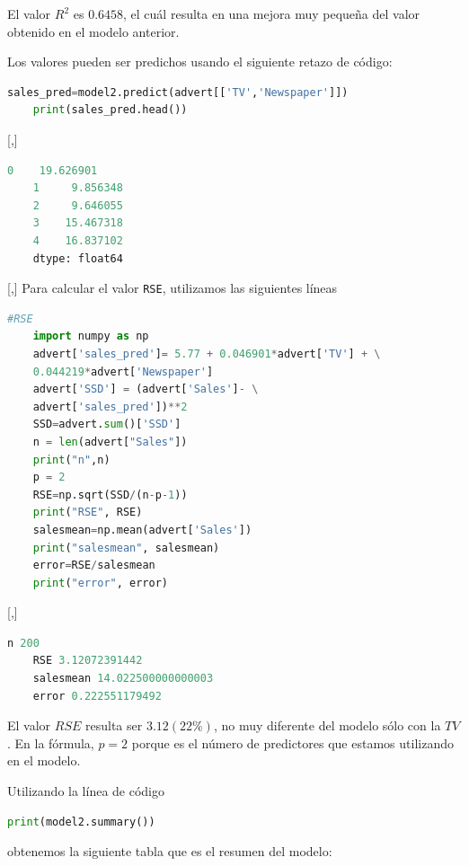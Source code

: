 El valor $R^{2}$ es $0.6458$, el cuál resulta en una mejora muy pequeña del valor obtenido en el modelo anterior.

Los valores pueden ser predichos usando el siguiente retazo de código:
\begin{lstlisting}[language=Python]
	sales_pred=model2.predict(advert[['TV','Newspaper']])
	print(sales_pred.head())
\end{lstlisting}

[,]{}
\begin{lstlisting}[language=Python]
	0    19.626901
	1     9.856348
	2     9.646055
	3    15.467318
	4    16.837102
	dtype: float64
\end{lstlisting}

[,]{}
Para calcular el valor \texttt{RSE}, utilizamos las siguientes líneas
\begin{lstlisting}[language=Python]
	#RSE
	import numpy as np
	advert['sales_pred']= 5.77 + 0.046901*advert['TV'] + \
	0.044219*advert['Newspaper']
	advert['SSD'] = (advert['Sales']- \
	advert['sales_pred'])**2
	SSD=advert.sum()['SSD']
	n = len(advert["Sales"])
	print("n",n)
	p = 2
	RSE=np.sqrt(SSD/(n-p-1))
	print("RSE", RSE)
	salesmean=np.mean(advert['Sales'])
	print("salesmean", salesmean)
	error=RSE/salesmean
	print("error", error)
\end{lstlisting}

[,]{}
\begin{lstlisting}[language=Python]
	n 200
	RSE 3.12072391442
	salesmean 14.022500000000003
	error 0.222551179492
\end{lstlisting}


El valor $RSE$ resulta ser $3.12 (22\%)$, no muy diferente del modelo sólo con la $TV$. En la fórmula, $p=2$ porque es el número de predictores que estamos utilizando en el modelo.

Utilizando la línea de código
\begin{lstlisting}[language=Python]
	print(model2.summary())
\end{lstlisting} obtenemos la siguiente tabla que es el resumen del modelo:


